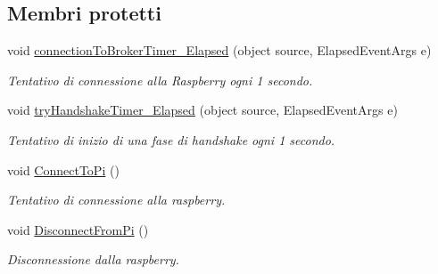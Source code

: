 \subsection*{Membri protetti}
\begin{DoxyCompactItemize}
\item 
\mbox{\label{classclient__app_1_1_main_window_a8cbc8fb4ae206e8fb22dd1485dbcdda6}} 
void \mbox{\hyperlink{classclient__app_1_1_main_window_a8cbc8fb4ae206e8fb22dd1485dbcdda6}{connection\+To\+Broker\+Timer\+\_\+\+Elapsed}} (object source, Elapsed\+Event\+Args e)
\begin{DoxyCompactList}\small\item\em Tentativo di connessione alla Raspberry ogni 1 secondo. \end{DoxyCompactList}\item 
\mbox{\label{classclient__app_1_1_main_window_a111d94def783172d78c8483403add41c}} 
void \mbox{\hyperlink{classclient__app_1_1_main_window_a111d94def783172d78c8483403add41c}{try\+Handshake\+Timer\+\_\+\+Elapsed}} (object source, Elapsed\+Event\+Args e)
\begin{DoxyCompactList}\small\item\em Tentativo di inizio di una fase di handshake ogni 1 secondo. \end{DoxyCompactList}\item 
\mbox{\label{classclient__app_1_1_main_window_a6a3389d7cea8d48931fbffb7314ebd38}} 
void \mbox{\hyperlink{classclient__app_1_1_main_window_a6a3389d7cea8d48931fbffb7314ebd38}{Connect\+To\+Pi}} ()
\begin{DoxyCompactList}\small\item\em Tentativo di connessione alla raspberry. \end{DoxyCompactList}\item 
\mbox{\label{classclient__app_1_1_main_window_afe203851a4866717ef54cc12db4e61ad}} 
void \mbox{\hyperlink{classclient__app_1_1_main_window_afe203851a4866717ef54cc12db4e61ad}{Disconnect\+From\+Pi}} ()
\begin{DoxyCompactList}\small\item\em Disconnessione dalla raspberry. \end{DoxyCompactList}\item 

\end{DoxyCompactItemize}
